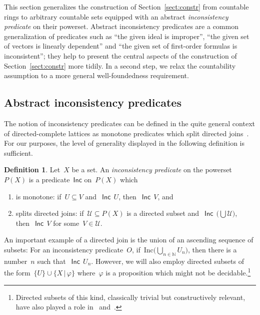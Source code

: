 \documentclass[com,11pt,crcready]{iosart2x}
\theoremstyle{definition}
\newtheorem{definition}{Definition}[section]
\theoremstyle{plain}
\theoremstyle{remark}
\newcommand{\Incbare}{\mathsf{Inc}}
\newcommand{\Inc}[1]{\operatorname{\Incbare}\,#1}
\newcommand{\?}{\,{:}\,}
\newcommand{\NN}{\mathbb{N}}
\renewcommand{\_}{\mathpunct{.}\,}
\begin{document}
This section generalizes the construction of Section~\ref{sect:constr} from
countable rings to arbitrary countable sets equipped with an abstract
\emph{inconsistency predicate} on their powerset. Abstract inconsistency
predicates are a common generalization of predicates such as ``the given ideal is
improper'', ``the given set of vectors is linearly dependent'' and ``the given
set of first-order formulas is inconsistent''; they help to present the
central aspects of the construction of Section~\ref{sect:constr} more tidily.
In a second step, we relax the countability assumption to a more general
well-foundedness requirement.


\subsection{Abstract inconsistency predicates}

The notion of inconsistency predicates can be defined in the quite general
context of directed-complete lattices as monotone predicates which split
directed joins~\cite{schuster-wessel:jacincpred}. For our purposes, the level of generality displayed in the
following definition is sufficient.

\begin{definition}Let~$X$ be a set. An \emph{inconsistency predicate} on the
powerset~$P(X)$ is a predicate~$\Incbare$ on~$P(X)$ which
\begin{enumerate}
\item is monotone: if~$U \subseteq V$ and~$\Inc{U}$, then~$\Inc{V}$, and
\item splits directed joins: if~$\mathcal{U} \subseteq P(X)$ is a directed subset
and~$\Inc{\bigl(\bigcup \mathcal{U}\bigr)}$, then~$\Inc{V}$ for some~$V \in \mathcal{U}$.
\end{enumerate}
\end{definition}

An important example of a directed join is the union of an ascending sequence
of subsets: For an inconsistency predicate~$O$, if~$\mathrm{Inc}{\bigl(\bigcup_{n \in \NN}
U_n\bigr)}$, then there is a number~$n$ such that~$\Inc{U_n}$. However, we will also
employ directed subsets of the form~$\{ U \} \cup \{ X \,|\, \varphi \}$
where~$\varphi$ is a proposition which might not be
decidable.\footnote{Directed subsets of this kind, classically trivial but
constructively relevant, have also played a role
in~\cite[Lemma~1]{schuster-wessel:jacincpred}
and~\cite[Example~I.1.7(2)]{moerdijk-vermeulen:proper-maps}.}
\end{document}
